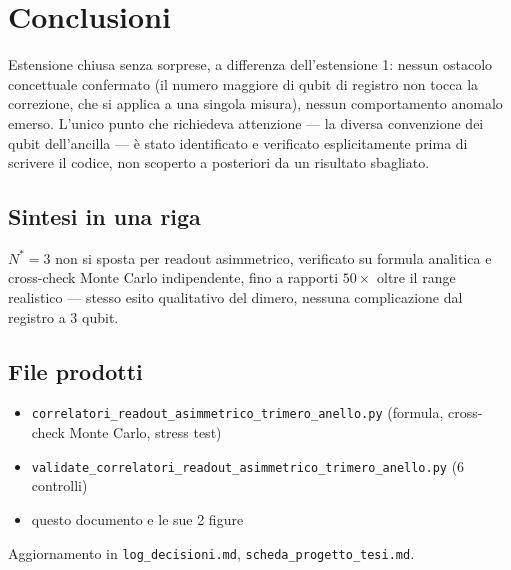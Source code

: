 \documentclass[11pt,a4paper]{article}
\begin{document}
\section{Conclusioni}

Estensione chiusa senza sorprese, a differenza dell'estensione 1: nessun ostacolo concettuale
confermato (il numero maggiore di qubit di registro non tocca la correzione, che si applica a una
singola misura), nessun comportamento anomalo emerso. L'unico punto che richiedeva attenzione ---
la diversa convenzione dei qubit dell'ancilla --- è stato identificato e verificato esplicitamente
prima di scrivere il codice, non scoperto a posteriori da un risultato sbagliato.

\subsection*{Sintesi in una riga}
$N^*=3$ non si sposta per readout asimmetrico, verificato su formula analitica e cross-check
Monte Carlo indipendente, fino a rapporti $50\times$ oltre il range realistico --- stesso esito
qualitativo del dimero, nessuna complicazione dal registro a 3 qubit.

\subsection*{File prodotti}
\begin{itemize}[nosep,leftmargin=1.3em]
  \item \texttt{correlatori\_readout\_asimmetrico\_trimero\_anello.py} (formula, cross-check
  Monte Carlo, stress test)
  \item \texttt{validate\_correlatori\_readout\_asimmetrico\_trimero\_anello.py} (6 controlli)
  \item questo documento e le sue 2 figure
\end{itemize}
\noindent Aggiornamento in \texttt{log\_decisioni.md}, \texttt{scheda\_progetto\_tesi.md}.
\end{document}

